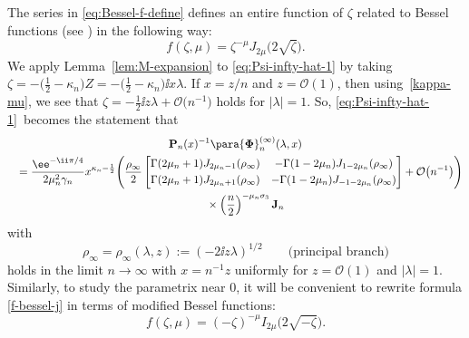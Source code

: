 The series in \eqref{eq:Bessel-f-define} defines an entire function of $\zeta$ related to Bessel functions (see \cite[Chapter~10]{DLMF}) in the following way:
\begin{equation}
\label{f-bessel-j}
 f(\zeta,\mu)=\zeta^{-{\mu}{}}J_{2\mu}\big(2\sqrt{\zeta}\big).
\end{equation}
We apply Lemma~\ref{lem:M-expansion} to \eqref{eq:Psi-infty-hat-1} by taking $\zeta=-\big(\frac{1}{2}-\kappa_n\big)Z=-\big(\frac{1}{2}-\kappa_n\big)\ii x\lambda$. If $x=z/n$ and $z=\mathcal{O}(1)$, then using~\eqref{kappa-mu}, we see that $\zeta=-\frac{1}{2}\ii z\lambda + \mathcal{O}\big(n^{-1}\big)$ holds for $|\lambda|=1$. So, \eqref{eq:Psi-infty-hat-1}~becomes the statement that
\begin{gather*}
 \mathbf{P}_n(x)^{-1}\para{\mathbf{\Phi}}_n^{(\infty)}(\lambda,x)
\\
\quad=\frac{\ee^{-\ii\pi/4}}{2\mu_n^2\gamma_n}x^{\kappa_n-\frac{1}{2}}\Bigg(\frac{\rho_\infty}{2}\begin{bmatrix}
 \Gamma(2\mu_n+1) J_{2\mu_n-1}(\rho_\infty) & -\Gamma(1-2\mu_n) J_{1-2\mu_n}(\rho_\infty) \vspace{1mm}\\
 \Gamma(2\mu_n+1) J_{2\mu_n+1}(\rho_\infty) & -\Gamma(1-2\mu_n) J_{-1-2\mu_n}(\rho_\infty)
 \end{bmatrix}+\mathcal{O}\big(n^{-1}\big)\Bigg) \\
 \phantom{\quad=}{}\times\left(\dfrac{n}{2} \right)^{-\mu_n \sigma_3}
 \mathbf{J}_n
\end{gather*}
with
\begin{equation}
 \rho_\infty=\rho_\infty(\lambda,z):=(-2\ii z\lambda)^{1/2}\qquad\text{(principal branch)}
 \label{eq:rho-infty-branch}
\end{equation}
holds in the limit $n\to\infty$ with $x=n^{-1}z$ uniformly for $z=\mathcal{O}(1)$ and $|\lambda|=1$. Similarly, to study the parametrix near 0, it will be convenient to rewrite formula \eqref{f-bessel-j} in terms of modified Bessel functions:
\begin{equation*}
 f(\zeta, \mu) = (-\zeta)^{-\mu} I_{2\mu}\big(2 \sqrt{-\zeta} \big).
\end{equation*}

